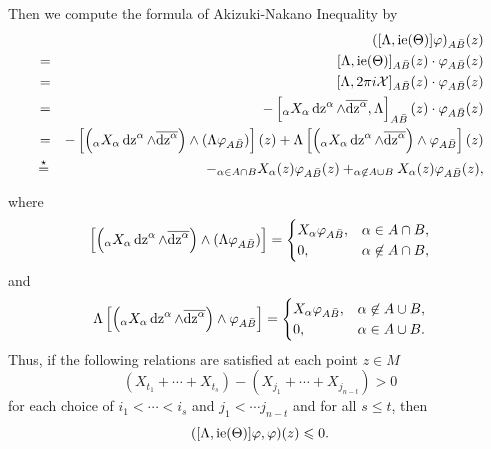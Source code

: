 \documentclass[lang=en,12pt]{beautybook}
\begin{document}
Then we compute the formula of Akizuki-Nakano Inequality by
\begin{eqnarray*}
  &&([\Lambda, \operatorname{ie} (\Theta)] \varphi)_{A \bar{B}} (z) \\
  & = & [\Lambda,
      \operatorname{ie} (\Theta)]_{A \bar{B}} (z) \cdot \varphi_{A \bar{B}} (z)\\
  & = & [\Lambda, 2 \pi i\mathcal{X}]_{A \bar{B}} (z) \cdot \varphi_{A
    \bar{B}} (z)\\
  & = & - \left[ \relax_{\alpha} X_{\alpha} \operatorname{dz}^{\alpha} \wedge
    \overline{\operatorname{dz}^{\alpha}}, \Lambda \right]_{A \bar{B}} (z) \cdot
  \varphi_{A \bar{B}} (z)\\
  & = & - \left[ \left( \relax_{\alpha} X_{\alpha} \operatorname{dz}^{\alpha} \wedge
    \overline{\operatorname{dz}^{\alpha}} \right) \wedge (\Lambda \varphi_{A \bar{B}})
    \right] (z) + \Lambda \left[ \left( \relax_{\alpha} X_{\alpha}
    \operatorname{dz}^{\alpha} \wedge \overline{\operatorname{dz}^{\alpha}} \right) \wedge
    \varphi_{A \bar{B}} \right] (z)\\
  & \mathop{=}\limits_{}^{\star} & - \relax_{\alpha \in A \cap B} X_{\alpha} (z)
  \varphi_{A \bar{B}} (z) + \relax_{\alpha \not{\in} A \cup B} X_{\alpha} (z)
  \varphi_{A \bar{B}} (z),
\end{eqnarray*}
where
\begin{align*}
  \left[ \left( \relax_{\alpha} X_{\alpha} \operatorname{dz}^{\alpha} \wedge
    \overline{\operatorname{dz}^{\alpha}} \right) \wedge (\Lambda \varphi_{A \bar{B}})
    \right] =
  \begin{cases}
    \relax X_{\alpha} \varphi_{A \bar{B}}, & \alpha \in A \cap B,     \\
    0,                                   & \alpha \not\in A \cap B,
  \end{cases}
\end{align*}
and
\begin{align*}
  \Lambda \left[ \left( \relax_{\alpha} X_{\alpha} \operatorname{dz}^{\alpha} \wedge
    \overline{\operatorname{dz}^{\alpha}} \right) \wedge \varphi_{A \bar{B}} \right]
  =\begin{cases}
     \relax X_{\alpha} \varphi_{A \bar{B}}, & \alpha \not\in A \cup
     B,                                                           \\
     0,                                   & \alpha \in A \cup B.
   \end{cases}
\end{align*}
Thus, if the following relations are satisfied at each point $z \in M$
\[  (X_{t_1} + \cdots + X_{t_s}) - (X_{j_1} + \cdots + X_{j_{n - t}}) > 0 \]
for each choice of $i_1 < \cdots < i_s$ and $j_1 < \cdots j_{n - t}$ and for
all $s \leqslant t$, then
\begin{equation}
  ( [\Lambda, \operatorname{ie} (\Theta)] \varphi, \varphi) (z) \leqslant 0. \label{2}
\end{equation}
\end{document}
